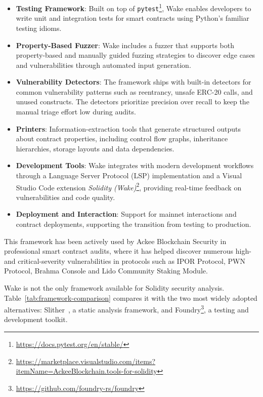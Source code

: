 \begin{itemize}
    \item \textbf{Testing Framework}: Built on top of \texttt{pytest}\footnote{\url{https://docs.pytest.org/en/stable/}}, Wake enables developers to write unit and integration tests for smart contracts using Python's familiar testing idioms.

    \item \textbf{Property-Based Fuzzer}: Wake includes a fuzzer that supports both property-based and manually guided fuzzing strategies to discover edge cases and vulnerabilities through automated input generation.

    \item \textbf{Vulnerability Detectors}: The framework ships with built-in detectors for common vulnerability patterns such as reentrancy, unsafe ERC-20 calls, and unused constructs. The detectors prioritize precision over recall to keep the manual triage effort low during audits.

    \item \textbf{Printers}: Information-extraction tools that generate structured outputs about contract properties, including control flow graphs, inheritance hierarchies, storage layouts and data dependencies.

    \item \textbf{Development Tools}: Wake integrates with modern development workflows through a Language Server Protocol (LSP) implementation and a Visual Studio Code extension \emph{Solidity (Wake)}\footnote{\url{https://marketplace.visualstudio.com/items?itemName=AckeeBlockchain.tools-for-solidity}}, providing real-time feedback on vulnerabilities and code quality.

    \item \textbf{Deployment and Interaction}: Support for mainnet interactions and contract deployments, supporting the transition from testing to production.
\end{itemize}

This framework has been actively used by Ackee Blockchain Security in professional smart contract audits, where it has helped discover numerous high- and critical-severity vulnerabilities in protocols such as IPOR Protocol, PWN Protocol, Brahma Console and Lido Community Staking Module.

Wake is not the only framework available for Solidity security analysis. Table~\ref{tab:framework-comparison} compares it with the two most widely adopted alternatives: Slither~\cite{feist2019slither}, a static analysis framework, and Foundry\footnote{\url{https://github.com/foundry-rs/foundry}}, a testing and development toolkit.

